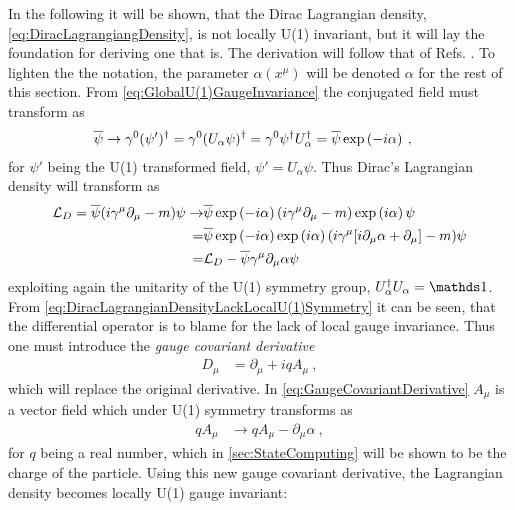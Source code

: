 \documentclass[../main.tex]{subfiles} %
\begin{document}
In the following it will be shown, that the Dirac Lagrangian density, \cref{eq:DiracLagrangiangDensity}, is not locally U(1) invariant, but it will lay the foundation for deriving one that is. The derivation will follow that of Refs. \cite{peskin_introToQFT_1995, griffiths_introToElementaryParticles_2008, panyella_masterThesis_2019}. To lighten the the notation, the parameter $\alpha(x^\mu)$ will be denoted $\alpha$ for the rest of this section. From \cref{eq:GlobalU(1)GaugeInvariance} the conjugated field must transform as
\begin{align}
    \psibar &\rightarrow \gamma^0 (\psi')\dagger
        = \gamma^0 (U_\alpha \psi)\dagger
        = \gamma^0\psi\dagger U_\alpha\dagger
        = \psibar\exp{-i\alpha} \: ,
\end{align}
for $\psi'$ being the U(1) transformed field, $\psi' = U_\alpha \psi$. Thus Dirac's Lagrangian density will transform as
\begin{align} \label{eq:DiracLagrangianDensityLackLocalU(1)Symmetry}
\begin{split}
    \L_D = \psibar (i \gamma^\mu \partial_\mu - m) \psi \rightarrow
        & \psibar \exp{-i\alpha} (i \gamma^\mu \partial_\mu - m) \exp{i\alpha} \psi \\
        =& \psibar \exp{-i\alpha} \exp{i\alpha} (i \gamma^\mu [i \partial_\mu \alpha + \partial_\mu] - m) \psi \\
        =& \L_D - \psibar\gamma^\mu \partial_\mu \alpha \psi
\end{split}
\end{align}
exploiting again the unitarity of the U(1) symmetry group, $U_\alpha\dagger U_\alpha = \id$. From \cref{eq:DiracLagrangianDensityLackLocalU(1)Symmetry} it can be seen, that the differential operator is to blame for the lack of local gauge invariance. Thus one must introduce the \emph{gauge covariant derivative}
\begin{align} \label{eq:GaugeCovariantDerivative}
    D_\mu &= \partial_\mu + iqA_\mu \: ,
\end{align}
which will replace the original derivative. In \cref{eq:GaugeCovariantDerivative} $A_\mu$ is a vector field which under U(1) symmetry transforms as
\begin{align}
    qA_\mu &\rightarrow qA_\mu - \partial_\mu\alpha \: ,
\end{align}
for $q$ being a real number, which in \cref{sec:StateComputing} will be shown to be the charge of the particle. Using this new gauge covariant derivative, the Lagrangian density becomes locally U(1) gauge invariant:
\end{document}
